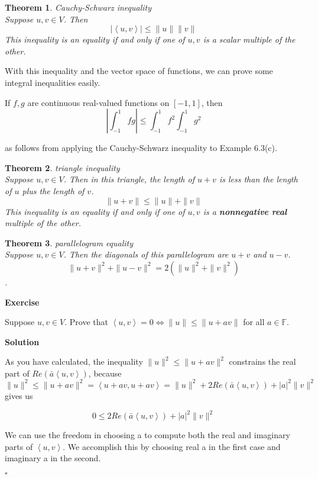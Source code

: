 \documentclass{article}
\newtheorem{theorem}{Theorem}[subsection]
\newenvironment{exercise}{%
{\textbf{Exercise\\}
    }
}{
}
\newenvironment{solution}{%
{
    \textbf{Solution\\}
    }
}{
  \hfill $\square$ 
  \par\bigskip 
}
\newcommand{\FF}{\mathbb{F}}
\begin{document}
\begin{CJK}{UTF8}{gkai}
\begin{theorem}
    Cauchy-Schwarz inequality\\

    Suppose $u,v \in V$. Then
    \[|\left<u, v\right>| \leq \|u\|\|v\|\]
    This inequality is an equality if and only if one of $u,v$ is a scalar multiple of the other.
\end{theorem}

With this inequality and the vector space of functions, we can prove some integral inequalities easily.


If $f,g$ are continuous real-valued functions on $[-1,1]$, then
\[\left|\int_{-1}^{1}fg\right| \leq {\int_{-1}^{1}f^2}{\int_{-1}^{1}g^2}\]

as follows from applying the Cauchy-Schwarz inequality to Example 6.3(c).

\begin{theorem}
    triangle inequality\\

    Suppose $u,v \in V$. Then in this triangle, the length of $u +v$ is less than the length of $u$ plus the length of $v$.
    \[\|u +v\| \leq \|u\|+\|v\|\]
    This inequality is an equality if and only if one of $u,v$ is a \textbf{nonnegative real} multiple of the other.
\end{theorem}

\begin{theorem}
    parallelogram equality\\

    Suppose $u,v \in V$. Then the diagonals of this parallelogram are $u +v$ and $u-v$.
    \[\|u +v\|^2 +\|u-v\|^2 = 2(\|u\|^2 +\|v\|^2)\].
\end{theorem}

\begin{exercise}
    Suppose $u,v \in V$. Prove that $\left<u,v\right> = 0 \Leftrightarrow \|u\| \leq \|u+av\|$ for all $a \in \FF$.  
\end{exercise}

\begin{solution}
    As you have calculated, the inequality $\|u\|^2\leq \|u+av\|^2$ constrains the real part of $Re(\bar{a}\left<u,v\right>)$, because
   \[\|u\|^2\leq \|u+av\|^2=\left<u+av,u+av\right>=\|u\|^2+2Re(\bar{a}\left<u,v\right>)+|a|^2 \|v\|^2\]
   gives us
   
   \[0\leq 2Re(\bar{a}\left<u,v\right>)+|a|^2\|v\|^2\]
   
    We can use the freedom in choosing a to compute both the real and imaginary parts of $\left<u,v\right>$. We accomplish this by choosing real a in the first case and imaginary a in the second.
   

\end{solution}
\end{CJK}
\end{document}
